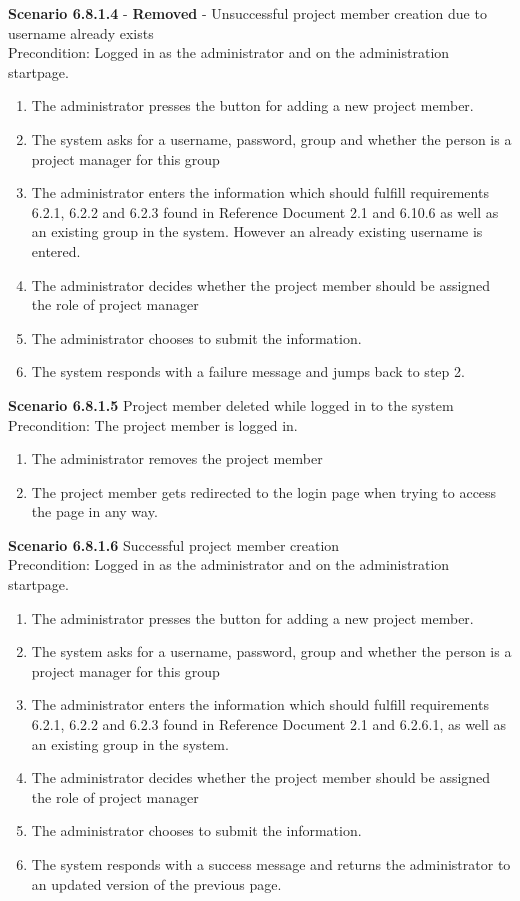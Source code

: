 \documentclass{article}
\begin{document}
\noindent\textbf{Scenario 6.8.1.4} - \textbf{Removed} - Unsuccessful project member creation due to username already exists  \\
Precondition: Logged in as the administrator and on the administration startpage.
\begin{enumerate}
\item The administrator presses the button for adding a new project member.
\item The system asks for a username, password, group and whether the person is a project manager for this group
\item The administrator enters the information which should fulfill requirements 6.2.1, 6.2.2 and 6.2.3 found in Reference Document 2.1 and 6.10.6 as well as an existing group in the system. However an already existing username is entered.
\item The administrator decides whether the project member should be assigned the role of project manager
\item The administrator chooses to submit the information.
\item The system responds with a failure message and jumps back to step 2.
\end{enumerate}

\noindent\textbf{Scenario 6.8.1.5} Project member deleted while logged in to the system \\
Precondition: The project member is logged in.
\begin{enumerate}
\item The administrator removes the project member
\item The project member gets redirected to the login page when trying to access the page in any way.\\
\end{enumerate}

\noindent\textbf{Scenario 6.8.1.6} Successful project member creation  \\
Precondition: Logged in as the administrator and on the administration startpage.
\begin{enumerate}
\item The administrator presses the button for adding a new project member.
\item The system asks for a username, password, group and whether the person is a project manager for this group
\item The administrator enters the information which should fulfill requirements 6.2.1, 6.2.2 and 6.2.3 found in Reference Document 2.1 and 6.2.6.1, as well as an existing group in the system.
\item The administrator decides whether the project member should be assigned the role of project manager
\item The administrator chooses to submit the information.
\item The system responds with a success message and returns the administrator to an updated version of the previous page.
\end{enumerate}
\end{document}

